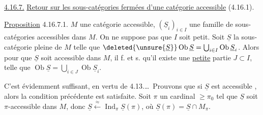 \uline{4.16.7.} \uline{Retour sur les sous-catégories fermées d'une
catégorie accessible} (4.16.1).

\uline{Proposition} 4.16.7.1.  $M$ une catégorie
accessible,  $(\underline S_i)_{i\in I}$ une famille de sous-catégories
 accessibles dans $M$. On ne suppose pas que  $I$ soit
petit. Soit $\underline S$ la sous-catégorie  pleine
de $M$ telle que $\deleted{\unsure{\underline S}}\operatorname{Ob}\underline S=\bigcup_{i\in I}\operatorname{Ob}\underline S_i$.
Alors pour que $\underline S$ soit accessible dans
$M$, il f. et s. qu'il existe une
\uline{petite} partie $J\subset I$, telle que
$\operatorname{Ob}\underline S=\bigcup_{i\in J}\operatorname{Ob}\underline S_i$.

C'est évidemment suffisant, en
vertu de 4.13.\ldots\ Prouvons  que
si $\underline S$ est accessible , alors la condition
précédente est satisfaite. Soit $\pi$ un cardinal
$\geq\pi_0$ tel que $\underline S$ soit $\pi$-accessible dans
$M$, donc $\underline S\xleftarrow{\approx}\operatorname{Ind}_\pi\underline S(\pi)$, où $\underline S(\pi)=\underline S\cap M_\pi$.
